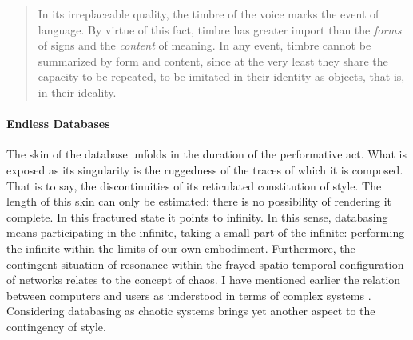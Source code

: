 \begin{quote}
	In its irreplaceable quality, the timbre of the voice marks the event of language. By virtue of this fact, timbre has greater import than the \textit{forms} of signs and the \textit{content} of meaning. In any event, timbre cannot be summarized by form and content, since at the very least they share the capacity to be repeated, to be imitated in their identity as objects, that is, in their ideality. \parencite[296]{Der82:Mar}
\end{quote}

\paragraph{Endless Databases}
The skin of the database unfolds in the duration of the performative act. What is exposed as its singularity is the ruggedness of the traces of which it is composed. That is to say, the discontinuities of its reticulated constitution of style. The length of this skin can only be estimated: there is no possibility of rendering it complete. In this fractured state it points to infinity. In this sense, databasing means participating in the infinite, taking a small part of the infinite: performing the infinite within the limits of our own embodiment. Furthermore, the contingent situation of resonance within the frayed spatio-temporal configuration of networks relates to the concept of chaos. I have mentioned earlier the relation between computers and users as understood in terms of complex systems . Considering databasing as chaotic systems brings yet another aspect to the contingency of style. 


